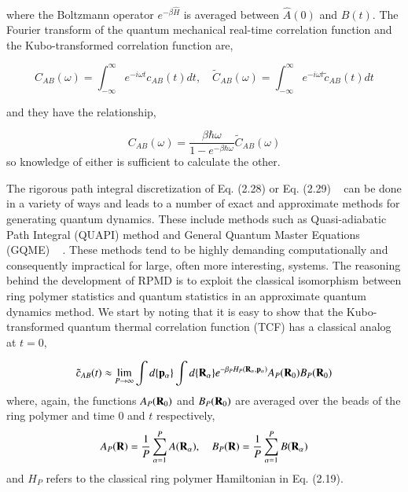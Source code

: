 \documentclass[phd,tocprelim]{cornell}
\begin{document}
where the Boltzmann operator $e^{-\beta \hat{H}}$ is averaged between $\hat{A}(0)$ and $\hat{B}(t)$. The Fourier transform of the quantum mechanical real-time correlation function and the Kubo-transformed correlation function are,

\begin{equation}
C_{AB} (\omega) = \int_{-\infty}^{\infty} e^{-i\omega t} c_{AB}(t) dt,  \quad \tilde{C}_{AB} (\omega) = \int_{-\infty}^{\infty} e^{-i\omega t} \tilde{c}_{AB}(t) dt
\end{equation}

and they have the relationship, 

\begin{equation}
C_{AB}(\omega) = \frac{\beta \hbar \omega}{1- e^{-\beta\hbar\omega}} \tilde{C}_{AB}(\omega)
\end{equation}
 so knowledge of either is sufficient to calculate the other. 

The rigorous path integral discretization of Eq. (2.28) or Eq. (2.29) ~\cite{FEYN1965} can be done in a variety of ways and leads to a number of exact and approximate methods for generating quantum dynamics. These include methods such as Quasi-adiabatic Path Integral (QUAPI) method \cite{MARKI1994, MAKRI1995} and General Quantum Master Equations (GQME) ~\cite{Markland2016, Markland2015} . These methods tend to be highly demanding computationally and consequently impractical for large, often more interesting, systems. The reasoning behind the development of RPMD is to exploit the classical isomorphism between ring polymer statistics and quantum statistics in an approximate quantum dynamics method. We start by noting that it is easy to show that the Kubo-transformed quantum thermal correlation function (TCF) has a classical analog at $t=0$,

\begin{equation}
\tilde{c}_{AB} (t) \approx \lim_{P \to \infty} \int   d\{{\bf{p}}_{\alpha}\}\int   d\{{\bf{R}}_{\alpha}\}  e^{-\beta_P H_P({\bf{R}}_{\alpha}, {\bf{p}}_{\alpha})} A_P({\bf{R}}_{0})B_P({\bf{R}}_{0})
\end{equation}
where, again,  the functions $A_P({\bf{R}}_{0})$ and $B_P({\bf{R}}_{0})$ are averaged over the beads of the ring polymer and time 0 and $t$ respectively,
\begin{equation}
A_P({\bf{R}}) =  \frac{1}{P} \sum_{\alpha=1}^{P}A({\bf{R}}_{\alpha}), \quad B_P({\bf{R}}) = \frac{1}{P} \sum_{\alpha=1}^{P}B({\bf{R}}_{\alpha})
\end{equation}
and $H_P$ refers to the classical ring polymer Hamiltonian in Eq. (2.19).
\end{document}
